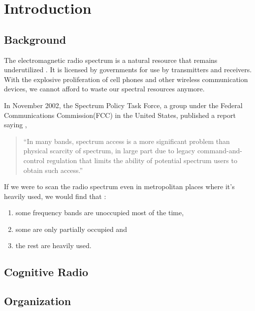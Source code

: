 \chapter{Introduction}
\section{Background}
The electromagnetic radio spectrum is a natural resource that remains underutilized \cite{haykin05}. It is licensed by governments for use by transmitters and receivers. With the explosive proliferation of cell phones and other wireless communication devices, we cannot afford to waste our spectral resources anymore.

In November 2002, the Spectrum Policy Task Force, a group under the Federal Communications Commission(FCC) in the United States, published a report saying \cite{repFCC}, 
\begin{quote}
``In many bands, spectrum access is a more significant problem than physical scarcity of spectrum, in large part due to legacy command-and-control regulation that limits the ability of potential spectrum users to obtain such access.''
\end{quote}

If we were to scan the radio spectrum even in metropolitan places where it's heavily used, we would find that \cite{staple04} :
\begin{enumerate}
	\item some frequency bands are unoccupied most of the time,
	\item some are only partially occupied and
	\item the rest are heavily used.
\end{enumerate}

\section{Cognitive Radio}



\section{Organization}